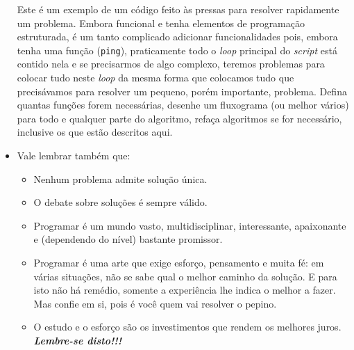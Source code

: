 \documentclass[a4paper, 12pt, onecolumn,singlespacing]{article}
\begin{document}
\begin{itemize}
Este é um exemplo de um código feito às pressas para resolver rapidamente um problema. Embora funcional e tenha elementos de programação estruturada, é um tanto complicado adicionar funcionalidades pois, embora tenha uma função (\texttt{ping}), praticamente todo o \textit{loop} principal do \textit{script} está contido nela e se precisarmos de algo complexo, teremos problemas para colocar tudo neste \textit{loop} da mesma forma que colocamos tudo que precisávamos para resolver um pequeno, porém importante, problema. Defina quantas funções forem necessárias, desenhe um fluxograma (ou melhor vários) para todo e qualquer parte do algoritmo, refaça algoritmos se for necessário, inclusive os que estão descritos aqui.
	\item Vale lembrar também que:
	\begin{itemize}
		\item Nenhum problema admite solução única.
		\item O debate sobre soluções é sempre válido.
		\item Programar é um mundo vasto, multidisciplinar, interessante, apaixonante e (dependendo do nível) bastante promissor.
		\item Programar é uma arte que exige esforço, pensamento e muita fé: em várias situações, não se sabe qual o melhor caminho da solução. E para isto não há remédio, somente a experiência lhe indica o melhor a fazer. Mas confie em si, pois é você quem vai resolver o pepino.
		\item O estudo e o esforço são os investimentos que rendem os melhores juros. \textbf{\textit{Lembre-se disto!!!}}
	\end{itemize}

\end{itemize}
\end{document}
